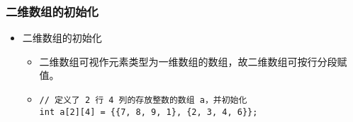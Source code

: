 \begin{frame}[fragile]
    \frametitle{二维数组的初始化}

    \begin{itemize}
        \item 二维数组的初始化
            \begin{itemize}[<+->]
                \item 二维数组可视作元素类型为一维数组的数组，故二维数组可按行分段赋值。
                \item
                    \lstinline|// 定义了 2 行 4 列的存放整数的数组 a，并初始化|\\
                    \lstinline|int a[2][4] = {{7, 8, 9, 1}, {2, 3, 4, 6}};|
            \end{itemize}
    \end{itemize}

    \begin{columns}



\end{columns}
\end{frame}
